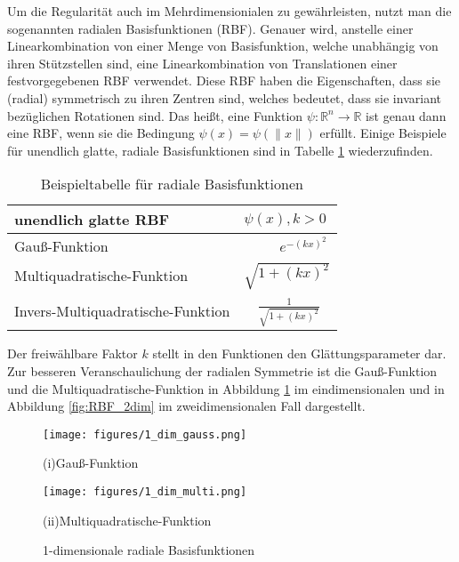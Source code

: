 \documentclass[a4paper,11pt]{article}
\begin{document}
Um die Regularität auch im Mehrdimensionialen zu gewährleisten, nutzt man die sogenannten radialen Basisfunktionen (RBF). Genauer wird, anstelle einer Linearkombination von einer Menge von Basisfunktion, welche unabhängig von ihren Stützstellen sind, eine Linearkombination von Translationen einer festvorgegebenen RBF verwendet. Diese RBF haben die Eigenschaften, dass sie (radial) symmetrisch zu ihren Zentren sind, welches bedeutet, dass sie invariant bezüglichen Rotationen sind. Das heißt, eine Funktion $\psi:\mathbb{R}^n\rightarrow\mathbb{R}$ ist genau dann eine RBF, wenn sie die Bedingung $\psi(x)=\psi(\|x\|)$ erfüllt. Einige Beispiele für unendlich glatte, radiale Basisfunktionen sind in Tabelle \ref{tbl:funktionstabelle} wiederzufinden.
\begin{table}[H]
\centering
\begin{tabular}{|l|l|}
\hline
\textbf{unendlich glatte RBF}  & \textbf{$\psi(x), k>0$} \\
\hline
\rule{0pt}{15pt}Gauß-Funktion&~~~~~$e^{-(kx)^2}$\\
\rule{0pt}{15pt}Multiquadratische-Funktion& $\sqrt{1+(kx)^2}$\\
\rule{0pt}{15pt}Invers-Multiquadratische-Funktion&~~$\frac{1}{\sqrt{1+(kx)^2}}$\\
\hline
\end{tabular}
\caption{Beispieltabelle für radiale Basisfunktionen}
\label{tbl:funktionstabelle}
\end{table}
\noindent
Der freiwählbare Faktor $k$ stellt in den Funktionen den Glättungsparameter dar. Zur besseren Veranschaulichung der radialen Symmetrie ist die Gauß-Funktion und die Multiquadratische-Funktion in Abbildung \ref{fig:RBF_1dim} im eindimensionalen und in Abbildung \ref{fig:RBF_2dim} im zweidimensionalen Fall dargestellt.
\begin{figure}[H]
	\centering
\hspace{-1.4cm}
\begin{minipage}{0.45\textwidth}
	\texttt{[image: figures/1\_dim\_gauss.png]}
	\caption*{(i)Gauß-Funktion}
\end{minipage}
\hspace{0.5cm}
\begin{minipage}{0.45\textwidth}
	\texttt{[image: figures/1\_dim\_multi.png]}
	\caption*{(ii)Multiquadratische-Funktion}
\end{minipage}
	\caption{1-dimensionale radiale Basisfunktionen}
	\label{fig:RBF_1dim}
\end{figure}
\end{document}
